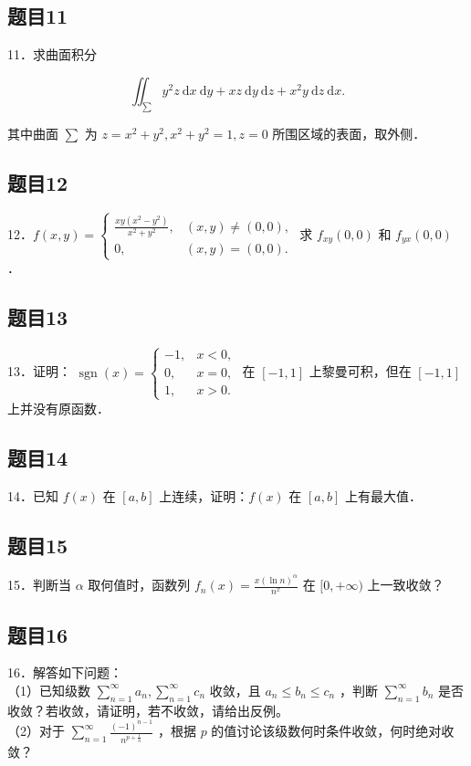\documentclass{article}
\begin{document}
\subsection{题目11}
11．求曲面积分

\[
\iint_{\sum} y^{2} z \mathrm{~d} x \mathrm{~d} y+x z \mathrm{~d} y \mathrm{~d} z+x^{2} y \mathrm{~d} z \mathrm{~d} x .
\]

其中曲面 \(\sum\) 为 \(z=x^{2}+y^{2}, x^{2}+y^{2}=1, z=0\) 所围区域的表面，取外侧．

\subsection{题目12}
12．\(f(x, y)=\left\{\begin{array}{ll}\frac{x y\left(x^{2}-y^{2}\right)}{x^{2}+y^{2}}, & (x, y) \neq(0,0), \\ 0, & (x, y)=(0,0) .\end{array}\right.\) 求 \(f_{x y}(0,0)\) 和 \(f_{y x}(0,0)\) ．

\subsection{题目13}
13．证明： \(\operatorname{sgn}(x)=\left\{\begin{array}{ll}-1, & x<0, \\ 0, & x=0, \\ 1, & x>0 .\end{array}\right.\) 在 \([-1,1]\) 上黎曼可积，但在 \([-1,1]\) 上并没有原函数．

\subsection{题目14}
14．已知 \(f(x)\) 在 \([a, b]\) 上连续，证明：\(f(x)\) 在 \([a, b]\) 上有最大值．

\subsection{题目15}
15．判断当 \(\alpha\) 取何值时，函数列 \(f_{n}(x)=\frac{x(\ln n)^{\alpha}}{n^{x}}\) 在 \([0,+\infty)\) 上一致收敛？

\subsection{题目16}
16．解答如下问题：\\
（1）已知级数 \(\sum_{n=1}^{\infty} a_{n}, \sum_{n=1}^{\infty} c_{n}\) 收敛，且 \(a_{n} \leq b_{n} \leq c_{n}\) ，判断 \(\sum_{n=1}^{\infty} b_{n}\) 是否收敛？若收敛，请证明，若不收敛，请给出反例。\\
（2）对于 \(\sum_{n=1}^{\infty} \frac{(-1)^{n-1}}{n^{p+\frac{1}{n}}}\) ，根据 \(p\) 的值讨论该级数何时条件收敛，何时绝对收敛？
\end{document}
